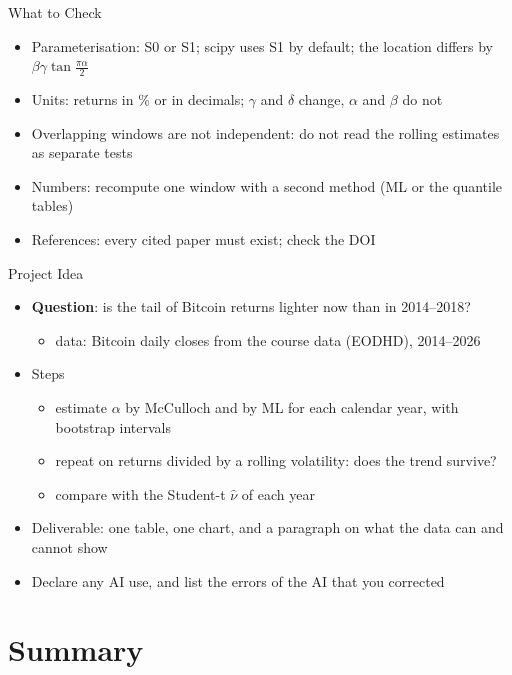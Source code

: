 \begin{frame}{What to Check}
\itemsize{\small}
\begin{itemize}
    \item Parameterisation: S0 or S1; scipy uses S1 by default; the location differs by $\beta\gamma\tan\frac{\pi\alpha}{2}$
    \item Units: returns in \% or in decimals; $\gamma$ and $\delta$ change, $\alpha$ and $\beta$ do not
    \item Overlapping windows are not independent: do not read the rolling estimates as separate tests
    \item Numbers: recompute one window with a second method (ML or the quantile tables)
    \item References: every cited paper must exist; check the DOI
\end{itemize}
\end{frame}

\begin{frame}{Project Idea}
\itemsize{\small}
\begin{itemize}
    \item \textbf{Question}: is the tail of Bitcoin returns lighter now than in 2014--2018?
    \begin{itemize}
        \item data: Bitcoin daily closes from the course data (EODHD), 2014--2026
    \end{itemize}
    \item Steps
    \begin{itemize}
        \item estimate $\alpha$ by McCulloch and by ML for each calendar year, with bootstrap intervals
        \item repeat on returns divided by a rolling volatility: does the trend survive?
        \item compare with the Student-t $\hat\nu$ of each year
    \end{itemize}
    \item Deliverable: one table, one chart, and a paragraph on what the data can and cannot show
    \item Declare any AI use, and list the errors of the AI that you corrected
\end{itemize}
\end{frame}


\section{Summary}

